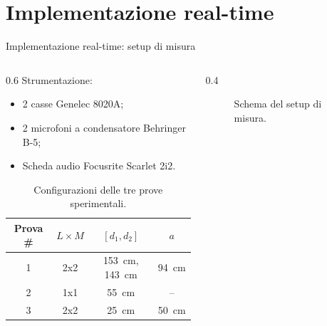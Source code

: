 \documentclass[aspectratio=169,xcolor=dvipsnames]{beamer}
\begin{document}
\section{Implementazione real-time}
\begin{frame}{Implementazione real-time: setup di misura}
	\begin{columns}[c, totalwidth=\textwidth]
		\begin{column}{0.6\textwidth}
			Strumentazione:
			\begin{itemize}
				\item 2 casse Genelec 8020A;
				\item 2 microfoni a condensatore Behringer B-5;
				\item Scheda audio Focusrite Scarlet 2i2.
			\end{itemize}

			\begin{table}[H]
		\centering
		\begin{tabular}{|c|c|c|c|}
			\hline
			Prova \# & $L\times M$ & $[d_1, d_2]$ & $a$\\
			\hline
			1 & 2x2 & \SI{153}{\centi\meter}, \SI{143}{\centi\meter}& \SI{94}{\centi\meter}\\
			\hline
			2 & 1x1 & \SI{55}{\centi\meter} & --  \\
			\hline
			3 & 2x2 & \SI{25}{\centi\meter} & \SI{50}{\centi\meter} \\
			\hline
		\end{tabular}
		\caption{Configurazioni delle tre prove sperimentali.}
		\label{tab:prove_lab}
	\end{table}
		\end{column}
		\begin{column}{0.4\textwidth}
			\begin{figure}
				\centering
				\resizebox{0.8\textwidth}{!}{}
				\caption{Schema del setup di misura.}
			\end{figure}
		\end{column}
	\end{columns}
\end{frame}
\end{document}
